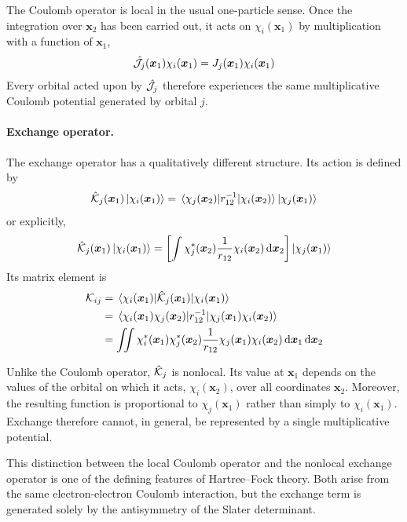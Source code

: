 \documentclass[11pt,a4paper,titlepage]{article}
\numberwithin{equation}{section}
\newcommand{\bx}{\boldsymbol{x}}
\newcommand{\chJ}{\Hat{\mathcal{J}}}
\newcommand{\chK}{\Hat{\mathcal{K}}}
\newcommand{\cK}{\mathcal{K}}
\begin{document}
The Coulomb operator is local in the usual one-particle sense. Once the
integration over $\bx_2$ has been carried out, it acts on $\chi_i(\bx_1)$ by
multiplication with a function of $\bx_1$,
\begin{equation}
  \chJ_j(\bx_1)\chi_i(\bx_1)
  =
  J_j(\bx_1)\chi_i(\bx_1)
\end{equation}
Every orbital acted upon by $\chJ_j$ therefore experiences the same
multiplicative Coulomb potential generated by orbital $j$.

\paragraph{Exchange operator.}

The exchange operator has a qualitatively different structure. Its action is
defined by
\begin{equation}
  \chK_j(\bx_1)\ket{\chi_i(\bx_1)}
  =
  \mel{\chi_j(\bx_2)}{r_{12}^{-1}}{\chi_i(\bx_2)}
  \ket{\chi_j(\bx_1)}
\end{equation}
or explicitly,
\begin{equation}
  \chK_j(\bx_1)\ket{\chi_i(\bx_1)}
  =
  \qty[
    \int
    \chi_j^*(\bx_2)
    \frac{1}{r_{12}}
    \chi_i(\bx_2)
    \dd{\bx_2}
  ]
  \ket{\chi_j(\bx_1)}
  \label{eq:exchange-operator}
\end{equation}
Its matrix element is
\begin{equation}
\begin{split}
  \cK_{ij}
  &=
  \mel{\chi_i(\bx_1)}
       {\chK_j(\bx_1)}
       {\chi_i(\bx_1)}
  \\
  &=
  \mel{\chi_i(\bx_1)\chi_j(\bx_2)}
       {r_{12}^{-1}}
       {\chi_j(\bx_1)\chi_i(\bx_2)}
  \\
  &=
  \iint
  \chi_i^*(\bx_1)
  \chi_j^*(\bx_2)
  \frac{1}{r_{12}}
  \chi_j(\bx_1)
  \chi_i(\bx_2)
  \dd{\bx_1}\dd{\bx_2}
\end{split}
\end{equation}

Unlike the Coulomb operator, $\chK_j$ is nonlocal. Its value at
$\bx_1$ depends on the values of the orbital on which it acts,
$\chi_i(\bx_2)$, over all coordinates $\bx_2$. Moreover, the resulting
function is proportional to $\chi_j(\bx_1)$ rather than simply to
$\chi_i(\bx_1)$. Exchange therefore cannot, in general, be represented by a
single multiplicative potential.

This distinction between the local Coulomb operator and the nonlocal exchange
operator is one of the defining features of Hartree--Fock theory. Both arise
from the same electron-electron Coulomb interaction, but the exchange term
is generated solely by the antisymmetry of the Slater determinant.
\end{document}
